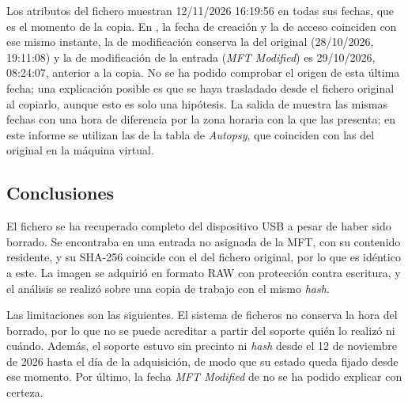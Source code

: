 Los atributos  del fichero muestran 12/11/2026 16:19:56 en
todas sus fechas, que es el momento de la copia. En ,
la fecha de creación y la de acceso coinciden con ese mismo instante, la de
modificación conserva la del original (28/10/2026, 19:11:08) y la de
modificación de la entrada (\textit{MFT Modified}) es 29/10/2026, 08:24:07,
anterior a la copia. No se ha podido comprobar el origen de esta última fecha;
una explicación posible es que se haya trasladado desde el fichero original al
copiarlo, aunque esto es solo una hipótesis. La salida de  muestra
las mismas fechas con una hora de diferencia por la zona horaria con la que las
presenta; en este informe se utilizan las de la tabla de \textit{Autopsy}, que
coinciden con las del original en la máquina virtual.

\subsection{Conclusiones}
El fichero  se ha recuperado completo del dispositivo
USB a pesar de haber sido borrado. Se encontraba en una entrada no asignada de
la MFT, con su contenido residente, y su SHA-256 coincide con el del fichero
original, por lo que es idéntico a este. La imagen se adquirió en formato RAW
con protección contra escritura, y el análisis se realizó sobre una copia de
trabajo con el mismo \textit{hash}.

Las limitaciones son las siguientes. El sistema de ficheros no conserva la hora
del borrado, por lo que no se puede acreditar a partir del soporte quién lo
realizó ni cuándo. Además, el soporte estuvo sin precinto ni \textit{hash}
desde el 12 de noviembre de 2026 hasta el día de la adquisición, de modo que su
estado queda fijado desde ese momento. Por último, la fecha \textit{MFT
Modified} de  no se ha podido explicar con
certeza.
